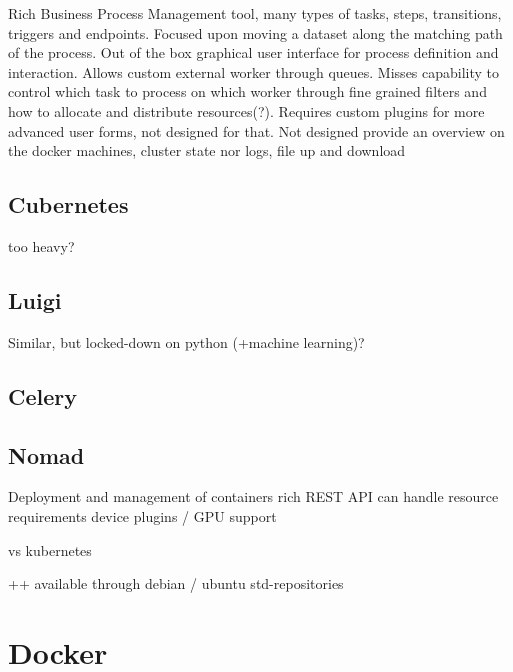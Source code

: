 Rich Business Process Management tool, many types of tasks, steps, transitions, triggers and endpoints.
Focused upon moving a dataset along the matching path of the process.
Out of the box graphical user interface for process definition and interaction.
Allows custom external worker through queues.
Misses capability to control which task to process on which worker through fine grained filters and how to allocate and distribute resources(?).
Requires custom plugins for more advanced user forms, not designed for that.
Not designed provide an overview on the docker machines, cluster state nor logs, file up and download

\subsection{Cubernetes}

too heavy?

\subsection{Luigi}

Similar, but locked-down on python  (+machine learning)?
\cite{luigi:etc:distributed_pipelines}

\subsection{Celery}

\cite{celery:main}

\subsection{Nomad}


\cite{nomad:main}
Deployment and management of containers
rich REST API
can handle resource requirements
device plugins / GPU support

vs kubernetes \cite{nomad:vs:kubernetes}

++ available through debian / ubuntu std-repositories

\section{Docker}
